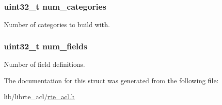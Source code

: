 \subsubsection[{num\+\_\+categories}]{\setlength{\rightskip}{0pt plus 5cm}uint32\+\_\+t num\+\_\+categories}\label{structrte__acl__config_aed3261c5c26c050f5808d181c9c4b974}
Number of categories to build with. \hypertarget{structrte__acl__config_a9674ba2b63ce1c10be3dc3aacb0ea063}{}
\subsubsection[{num\+\_\+fields}]{\setlength{\rightskip}{0pt plus 5cm}uint32\+\_\+t num\+\_\+fields}\label{structrte__acl__config_a9674ba2b63ce1c10be3dc3aacb0ea063}
Number of field definitions. 

The documentation for this struct was generated from the following file\+:\begin{DoxyCompactItemize}
\item 
lib/librte\+\_\+acl/\hyperlink{rte__acl_8h}{rte\+\_\+acl.\+h}\end{DoxyCompactItemize}
